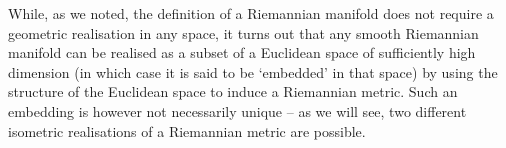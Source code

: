 
While, as we noted, the definition of a Riemannian manifold does not require a
geometric realisation in any space, it turns out that any smooth Riemannian manifold can be realised as a subset of a Euclidean space of sufficiently high dimension (in which case it is said to be `embedded' in that space) by using the structure of the Euclidean space to induce a Riemannian
metric. Such an embedding is however not necessarily unique -- as we will see, two different isometric 
realisations of a Riemannian metric are possible. 






